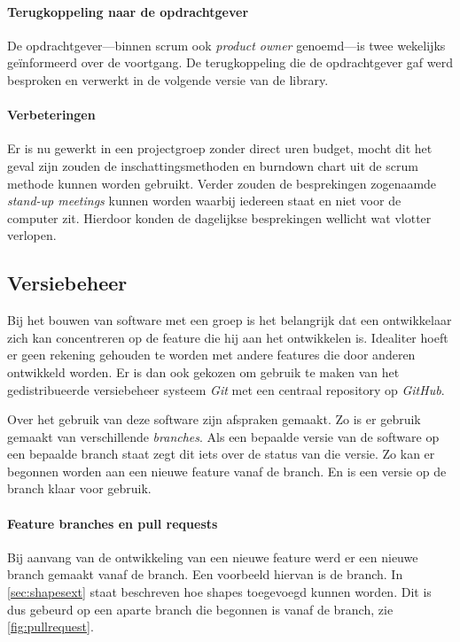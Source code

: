 \paragraph{Terugkoppeling naar de opdrachtgever} De opdrachtgever—binnen scrum ook \emph{product owner} genoemd—is twee wekelijks ge\"informeerd over de voortgang. De terugkoppeling die de opdrachtgever gaf werd besproken en verwerkt in de volgende versie van de library.

\paragraph{Verbeteringen} Er is nu gewerkt in een projectgroep zonder direct uren budget, mocht dit het geval zijn zouden de inschattingsmethoden en burndown chart uit de scrum methode kunnen worden gebruikt. Verder zouden de besprekingen zogenaamde \emph{stand-up meetings} kunnen worden waarbij iedereen staat en niet voor de computer zit. Hierdoor konden de dagelijkse besprekingen wellicht wat vlotter verlopen.

\subsection{Versiebeheer}
Bij het bouwen van software met een groep is het belangrijk dat een ontwikkelaar zich kan concentreren op de feature die hij aan het ontwikkelen is. Idealiter hoeft er geen rekening gehouden te worden met andere features die door anderen ontwikkeld worden. Er is dan ook gekozen om gebruik te maken van het gedistribueerde versiebeheer systeem \emph{Git} met een centraal repository op \emph{GitHub}.

Over het gebruik van deze software zijn afspraken gemaakt. Zo is er gebruik gemaakt van verschillende \emph{branches}. Als een bepaalde versie van de software op een bepaalde branch staat zegt dit iets over de status van die versie. Zo kan er begonnen worden aan een nieuwe feature vanaf de  branch. En is een versie op de  branch klaar voor gebruik.

\paragraph{Feature branches en pull requests}
Bij aanvang van de ontwikkeling van een nieuwe feature werd er een nieuwe branch gemaakt vanaf de  branch. Een voorbeeld hiervan is de  branch. In \autoref{sec:shapesext} staat beschreven hoe  shapes toegevoegd kunnen worden. Dit is dus gebeurd op een aparte branch die begonnen is vanaf de  branch, zie \autoref{fig:pullrequest}. 

